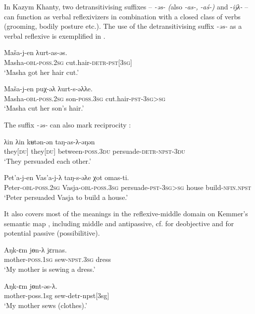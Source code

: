 \documentclass[output=paper]{langscibook}
\begin{document}
In Kazym Khanty, two detransitivising suffixes – \textit{{}-əs- (}also \textit{-as-,} \textit{-aś-)} and -\textit{ijλ-} – can function as verbal reflexivizers in combination with a closed class of verbs (grooming, bodily posture etc.). The use of the detransitivising suffix \textit{{}-əs-} as a verbal reflexive is exemplified in .

\ea 
\label{ex:Volkova:45}
	\ea
	\label{ex:Volkova:45a}
  	 \gll Maša-j-en λurt-as{}-əs.\\
  	 Masha\textsc{{}-obl-poss.2sg} cut.hair\textsc{{}-detr-pst[3sg}]\\
  	 \glt ‘Masha got her hair cut.’

	\ex
	\label{ex:Volkova:45b}
  	 \gll Maša-j-en puχ-əλ λurt-s-əλλe.\\
  	 Masha\textsc{{}-obl-poss.2sg} son\textsc{{}-poss.3sg} cut.hair\textsc{{}-pst-3sg>sg} \\
  	 \glt ‘Masha cut her son’s hair.’ 
	\z
\z


The suffix \textit{{}-əs-} can also mark reciprocity :

\ea 
\label{ex:Volkova:46}
	\ea
	\label{ex:Volkova:46a}
  	 \gll λin λin kʉtən-ən taŋ-as{}-λ{}-əŋən \\
  	 they[\textsc{du]} they[\textsc{du]} between\textsc{{}-poss.3du} persuade\textsc{{}-detr-npst-3du}\\
  	 \glt ‘They persuaded each other.’

	\ex
	\label{ex:Volkova:46b}
  	 \gll Pet’a{}-j{}-en Vas’a-j-λ taŋ-s{}-əλe χot omas-ti.\\
  	 Peter-\textsc{obl-poss.2sg} Vasja\textsc{{}-obl-poss.3sg} persuade\textsc{{}-pst-3sg>sg} house build\textsc{{}-nfin.npst}\\
  	 \glt ‘Peter persuaded Vasja to build a house.’
	\z
\z
 


It also covers most of the meanings in the reflexive-middle domain on Kemmer’s semantic map \citep{Kemmer1993}, including middle and antipassive, cf.  for deobjective and  for potential passive (possibilitive).

\ea 
\label{ex:Volkova:47}
	\ea
	\label{ex:Volkova:47a}
  	 \gll Aŋk-ɛm jɵn-λ  jɛrnas.\\
  	 mother\textsc{{}-poss.1sg} sew\textsc{{}-npst.3sg} dress\\
  	 \glt ‘My mother is sewing a dress.’

	\ex
	\label{ex:Volkova:47b}
  	 \gll Aŋk-ɛm jɵnt-əs-λ.\\
  	 mother-poss.1sg sew-detr-npst[3sg]\\
  	 \glt ‘My mother sews (clothes).’
  	 
\end{document}
